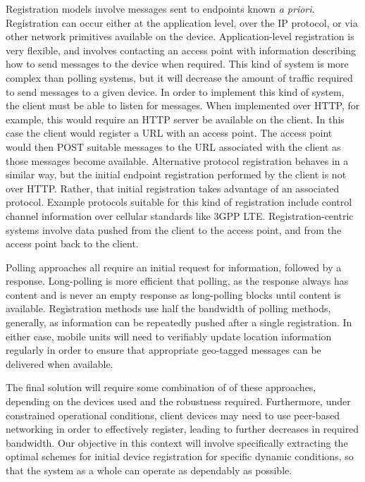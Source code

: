 \documentclass{sbir}
\begin{document}
Registration models involve messages sent to endpoints known {\sl a priori}.  Registration can occur either at the application level, over the IP protocol, or via other network primitives available on the device.  Application-level registration is very flexible, and involves contacting an access point with information describing how to send messages to the device when required.  This kind of system is more complex than polling systems, but it will decrease the amount of traffic required to send messages to a given device.  In order to implement this kind of system, the client must be able to listen for messages. When implemented over HTTP, for example, this would require an HTTP server be available on the client.  In this case the client would register a URL with an access point.  The access point would then POST suitable messages to the URL associated with the client as those messages become available.  Alternative protocol registration behaves in a similar way, but the initial endpoint registration performed by the client is not over HTTP.  Rather, that initial registration takes advantage of an associated protocol.  Example protocols suitable for this kind of registration include control channel information over cellular standards like 3GPP LTE. Registration-centric systems involve data pushed from the client to the access point, and from the access point back to the client. 

Polling approaches all require an initial request for information, followed by a response.  Long-polling is more efficient that polling, as the response always has content and is never an empty response as long-polling blocks until content is available.  Registration methods use half the bandwidth of polling methods, generally, as information can be repeatedly pushed after a single registration.  In either case, mobile units will need to verifiably update location information regularly in order to ensure that appropriate geo-tagged messages can be delivered when available.

The final solution will require some combination of of these approaches, depending on the devices used and the robustness required.  Furthermore, under constrained operational conditions, client devices may need to use peer-based networking in order to effectively register, leading to further decreases in required bandwidth.  Our objective in this context will involve specifically extracting the optimal schemes for initial device registration for specific dynamic conditions, so that the system as a whole can operate as dependably as possible.
\end{document}
